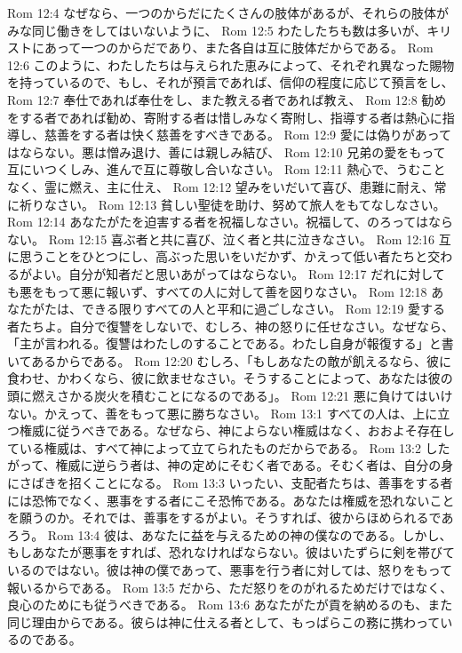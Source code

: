 Rom 12:4  なぜなら、一つのからだにたくさんの肢体があるが、それらの肢体がみな同じ働きをしてはいないように、
Rom 12:5  わたしたちも数は多いが、キリストにあって一つのからだであり、また各自は互に肢体だからである。
Rom 12:6  このように、わたしたちは与えられた恵みによって、それぞれ異なった賜物を持っているので、もし、それが預言であれば、信仰の程度に応じて預言をし、
Rom 12:7  奉仕であれば奉仕をし、また教える者であれば教え、
Rom 12:8  勧めをする者であれば勧め、寄附する者は惜しみなく寄附し、指導する者は熱心に指導し、慈善をする者は快く慈善をすべきである。
Rom 12:9  愛には偽りがあってはならない。悪は憎み退け、善には親しみ結び、
Rom 12:10  兄弟の愛をもって互にいつくしみ、進んで互に尊敬し合いなさい。
Rom 12:11  熱心で、うむことなく、霊に燃え、主に仕え、
Rom 12:12  望みをいだいて喜び、患難に耐え、常に祈りなさい。
Rom 12:13  貧しい聖徒を助け、努めて旅人をもてなしなさい。
Rom 12:14  あなたがたを迫害する者を祝福しなさい。祝福して、のろってはならない。
Rom 12:15  喜ぶ者と共に喜び、泣く者と共に泣きなさい。
Rom 12:16  互に思うことをひとつにし、高ぶった思いをいだかず、かえって低い者たちと交わるがよい。自分が知者だと思いあがってはならない。
Rom 12:17  だれに対しても悪をもって悪に報いず、すべての人に対して善を図りなさい。
Rom 12:18  あなたがたは、できる限りすべての人と平和に過ごしなさい。
Rom 12:19  愛する者たちよ。自分で復讐をしないで、むしろ、神の怒りに任せなさい。なぜなら、「主が言われる。復讐はわたしのすることである。わたし自身が報復する」と書いてあるからである。
Rom 12:20  むしろ、「もしあなたの敵が飢えるなら、彼に食わせ、かわくなら、彼に飲ませなさい。そうすることによって、あなたは彼の頭に燃えさかる炭火を積むことになるのである」。
Rom 12:21  悪に負けてはいけない。かえって、善をもって悪に勝ちなさい。
Rom 13:1  すべての人は、上に立つ権威に従うべきである。なぜなら、神によらない権威はなく、おおよそ存在している権威は、すべて神によって立てられたものだからである。
Rom 13:2  したがって、権威に逆らう者は、神の定めにそむく者である。そむく者は、自分の身にさばきを招くことになる。
Rom 13:3  いったい、支配者たちは、善事をする者には恐怖でなく、悪事をする者にこそ恐怖である。あなたは権威を恐れないことを願うのか。それでは、善事をするがよい。そうすれば、彼からほめられるであろう。
Rom 13:4  彼は、あなたに益を与えるための神の僕なのである。しかし、もしあなたが悪事をすれば、恐れなければならない。彼はいたずらに剣を帯びているのではない。彼は神の僕であって、悪事を行う者に対しては、怒りをもって報いるからである。
Rom 13:5  だから、ただ怒りをのがれるためだけではなく、良心のためにも従うべきである。
Rom 13:6  あなたがたが貢を納めるのも、また同じ理由からである。彼らは神に仕える者として、もっぱらこの務に携わっているのである。
